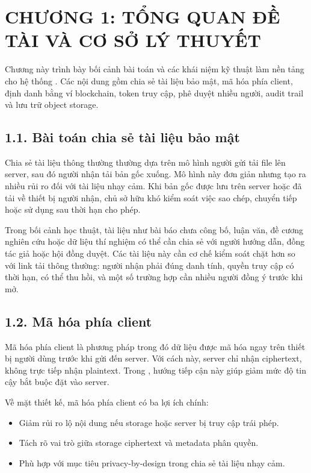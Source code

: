 \chapter*{CHƯƠNG 1: TỔNG QUAN ĐỀ TÀI VÀ CƠ SỞ LÝ THUYẾT}
{}

Chương này trình bày bối cảnh bài toán và các khái niệm kỹ thuật làm nền tảng cho hệ thống \projectname{}. Các nội dung gồm chia sẻ tài liệu bảo mật, mã hóa phía client, định danh bằng ví blockchain, token truy cập, phê duyệt nhiều người, audit trail và lưu trữ object storage.

\section*{1.1. Bài toán chia sẻ tài liệu bảo mật}
{}

Chia sẻ tài liệu thông thường thường dựa trên mô hình người gửi tải file lên server, sau đó người nhận tải bản gốc xuống. Mô hình này đơn giản nhưng tạo ra nhiều rủi ro đối với tài liệu nhạy cảm. Khi bản gốc được lưu trên server hoặc đã tải về thiết bị người nhận, chủ sở hữu khó kiểm soát việc sao chép, chuyển tiếp hoặc sử dụng sau thời hạn cho phép.

Trong bối cảnh học thuật, tài liệu như bài báo chưa công bố, luận văn, đề cương nghiên cứu hoặc dữ liệu thí nghiệm có thể cần chia sẻ với người hướng dẫn, đồng tác giả hoặc hội đồng duyệt. Các tài liệu này cần cơ chế kiểm soát chặt hơn so với link tải thông thường: người nhận phải đúng danh tính, quyền truy cập có thời hạn, có thể thu hồi, và một số trường hợp cần nhiều người đồng ý trước khi mở.

\section*{1.2. Mã hóa phía client}
{}

Mã hóa phía client là phương pháp trong đó dữ liệu được mã hóa ngay trên thiết bị người dùng trước khi gửi đến server. Với cách này, server chỉ nhận ciphertext, không trực tiếp nhận plaintext. Trong \projectname{}, hướng tiếp cận này giúp giảm mức độ tin cậy bắt buộc đặt vào server.

Về mặt thiết kế, mã hóa phía client có ba lợi ích chính:

\begin{itemize}
  \item Giảm rủi ro lộ nội dung nếu storage hoặc server bị truy cập trái phép.
  \item Tách rõ vai trò giữa storage ciphertext và metadata phân quyền.
  \item Phù hợp với mục tiêu privacy-by-design trong chia sẻ tài liệu nhạy cảm.
\end{itemize}

